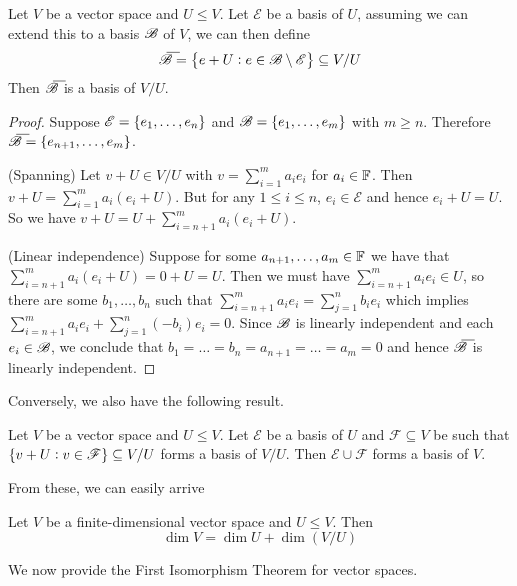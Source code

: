 \documentclass{styles/tufte}
\begin{document}

\begin{proposition}{}{}
  Let $V$ be a vector space and $U \leqslant V$. Let $\mathscr{E}$ be a basis of $U$, assuming we can extend this to a basis $\mathscr{B}$ of $V$, we can then define
  \[ \overline{\BB} = \set{e + U: e \in \BB \setminus \mathscr{E}} \subseteq V/U \]
  Then $\overline{\BB}$ is a basis of $V/U$.
\end{proposition}
\begin{proof}
  Suppose $\mathscr{E} = \set{e_1, \dots, e_n}$ and $\mathscr{B} = \set{e_1, \dots, e_m}$ with $m \geqslant n$. Therefore $\overline{\BB} = \set{e_{n+1}, \dots, e_m}$.
  
  (Spanning) Let $v + U \in V/U$ with $v = \sum_{i=1}^m a_i e_i$ for $a_i \in \mathbb{F}$. Then $v + U = \sum_{i=1}^m a_i(e_i + U)$. But for any $1 \leqslant i \leqslant n$, $e_i \in \mathscr{E}$ and hence $e_i + U = U$. So we have $v + U = U + \sum_{i=n+1}^m a_i (e_i + U)$.
  
  (Linear independence) Suppose for some $a_{n+1}, \dots, a_m \in \mathbb{F}$ we have that $\sum_{i=n+1}^m a_i(e_i + U) = 0 + U = U$. Then we must have $\sum_{i=n+1}^m a_i e_i \in U$, so there are some $b_1, \dots, b_n$ such that $\sum_{i=n+1}^m a_i e_i = \sum_{j=1}^n b_i e_i$ which implies $\sum_{i=n+1}^m a_i e_i + \sum_{j=1}^n (-b_i) e_i = 0$. Since $\mathscr{B}$ is linearly independent and each $e_i \in \mathscr{B}$, we conclude that $b_1 = \dots = b_n = a_{n+1} = \dots = a_{m} = 0$ and hence $\overline{\BB}$ is linearly independent.	
\end{proof}

Conversely, we also have the following result.

\begin{proposition}{}{}
  Let $V$ be a vector space and $U \leqslant V$. Let $\mathscr{E}$ be a basis of $U$ and $\mathscr{F} \subseteq V$ be such that $\set{v + U: v \in \mathscr{F}} \subseteq V/U$ forms a basis of $V/U$. Then $\mathscr{E} \cup \mathscr{F}$ forms a basis of $V$.
\end{proposition}

From these, we can easily arrive

\begin{corollary}{}{}
  Let $V$ be a finite-dimensional vector space and $U \leqslant V$. Then
  \[ \dim V = \dim U + \dim(V/U) \]
\end{corollary}

We now provide the First Isomorphism Theorem for vector spaces.
\end{document}
